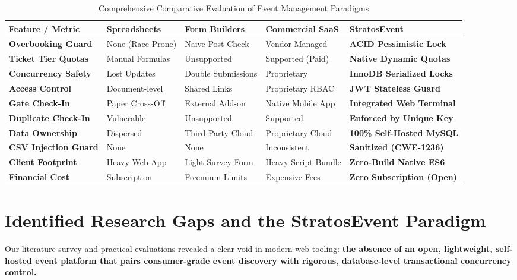 \documentclass[11pt,a4paper]{report}
\begin{document}
\begin{table}[H]
\centering
\fontsize{8.5}{11}\selectfont
\renewcommand{\arraystretch}{1.35}
\setlength{\tabcolsep}{4pt}
\caption{Comprehensive Comparative Evaluation of Event Management Paradigms}
\label{tab:comparative_analysis}
\begin{tabularx}{\textwidth}{|p{}|X|X|X|X|}
\hline
\rowcolor{TCSBlue}
\color{white}\bfseries Feature / Metric & 
\color{white}\bfseries Spreadsheets & 
\color{white}\bfseries Form Builders & 
\color{white}\bfseries Commercial SaaS & 
\color{white}\bfseries StratosEvent \\\hline

\textbf{Overbooking Guard} & None (Race Prone) & Naive Post-Check & Vendor Managed & \textbf{ACID Pessimistic Lock} \\\hline
\textbf{Ticket Tier Quotas} & Manual Formulas & Unsupported & Supported (Paid) & \textbf{Native Dynamic Quotas} \\\hline
\textbf{Concurrency Safety} & Lost Updates & Double Submissions & Proprietary & \textbf{InnoDB Serialized Locks} \\\hline
\textbf{Access Control} & Document-level & Shared Links & Proprietary RBAC & \textbf{JWT Stateless Guard} \\\hline
\textbf{Gate Check-In} & Paper Cross-Off & External Add-on & Native Mobile App & \textbf{Integrated Web Terminal} \\\hline
\textbf{Duplicate Check-In} & Vulnerable & Unsupported & Supported & \textbf{Enforced by Unique Key} \\\hline
\textbf{Data Ownership} & Dispersed & Third-Party Cloud & Proprietary Cloud & \textbf{100\% Self-Hosted MySQL} \\\hline
\textbf{CSV Injection Guard} & None & None & Inconsistent & \textbf{Sanitized (CWE-1236)} \\\hline
\textbf{Client Footprint} & Heavy Web App & Light Survey Form & Heavy Script Bundle & \textbf{Zero-Build Native ES6} \\\hline
\textbf{Financial Cost} & Subscription & Freemium Limits & Expensive Fees & \textbf{Zero Subscription (Open)} \\\hline
\end{tabularx}
\end{table}

\section{Identified Research Gaps and the StratosEvent Paradigm}
\justifying
Our literature survey and practical evaluations revealed a clear void in modern web tooling: \textbf{the absence of an open, lightweight, self-hosted event platform that pairs consumer-grade event discovery with rigorous, database-level transactional concurrency control.}
\end{document}
